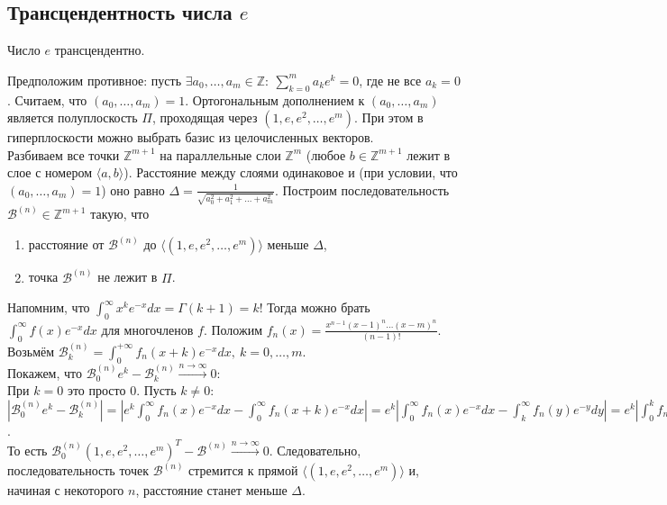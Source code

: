 \subsection{Трансцендентность числа $e$}
\begin{theorem}
	Число $e$ трансцендентно.
\end{theorem}
\begin{pf}
	Предположим противное: пусть $\displaystyle \exists a_0,\dots,a_m \in \mathbb{Z}: \ \sum\limits_{k=0}^m a_ke^k = 0$, где не все $a_k = 0$. 
	Считаем, что $\left( a_0, \dots, a_m \right)=1$. Ортогональным дополнением к $\left( a_0, \dots, a_m \right)$ является полуплоскость $\Pi$, проходящая через $\left( 1, e, e^2, \dots, e^m \right)$. При этом в гиперплоскости можно выбрать базис из целочисленных векторов.\\
	Разбиваем все точки $\mathbb{Z}^{m+1}$ на параллельные слои $\mathbb{Z}^m$ (любое $b \in \mathbb{Z}^{m+1}$ лежит в слое с номером $\langle a,b \rangle$). Расстояние между слоями одинаковое и (при условии, что $(a_0,\dots,a_m) = 1$) оно равно $\displaystyle \Delta = \frac{1}{\sqrt{a_0^2 + a_1^2 +\dots+ a_m^2}}$. Построим последовательность $\mathcal{B}^{(n)} \in \mathbb{Z}^{m+1}$ такую, что
	\begin{enumerate}[nolistsep]
		\item[1)] расстояние от $\mathcal{B}^{(n)}$ до $\langle \left(1,e,e^2,\dots,e^m\right) \rangle$ меньше $\Delta$,
		\item[2)] точка $\mathcal{B}^{(n)}$ не лежит в $\Pi$.
	\end{enumerate}
	Напомним, что $\displaystyle \int_0^\infty x^ke^{-x}dx = \Gamma(k+1) = k!$ Тогда можно брать $\displaystyle \int_0^\infty f(x)e^{-x}dx$ для многочленов $f$. Положим $\displaystyle f_n(x) = \frac{x^{n-1}(x-1)^n\dots(x-m)^n}{(n-1)!}$. Возьмём $\displaystyle \mathcal{B}_k^{(n)} = \int_0^{+\infty} f_n(x+k)e^{-x}dx, \ k=0,\dots,m$.\\ Покажем, что $\mathcal{B}_0^{(n)}e^k - \mathcal{B}_k^{(n)} \xrightarrow{n \to \infty} 0$:\\
	При $k=0$ это просто $0$. Пусть $k \ne 0$: $\displaystyle \left| \mathcal{B}_0^{(n)}e^k - \mathcal{B}_k^{(n)} \right| = \left| e^k\int_0^\infty f_n(x)e^{-x}dx - \int_0^\infty f_n(x+k)e^{-x}dx \right| = e^k \left| \int_0^\infty f_n(x)e^{-x}dx - \int_k^\infty f_n(y)e^{-y}dy \right| = e^k \left| \int_0^k f_n(x)e^{-x}dx \right| \leq e^m m \frac{m^{n+nm-1}}{(n-1)!} = \frac{e^m m^{m(n+1)}}{(n-1)!} \xrightarrow{n \to \infty} 0$.\\
	То есть $\mathcal{B}_0^{(n)}\left( 1, e, e^2, \dots, e^m \right)^T - \mathcal{B}^{(n)} \xrightarrow{n \to \infty} 0$. Следовательно, последовательность точек $\mathcal{B}^{(n)}$ стремится к прямой $\langle \left( 1, e, e^2, \dots, e^m \right) \rangle$ и, начиная с некоторого $n$, расстояние станет меньше $\Delta$.\\

\end{pf}
